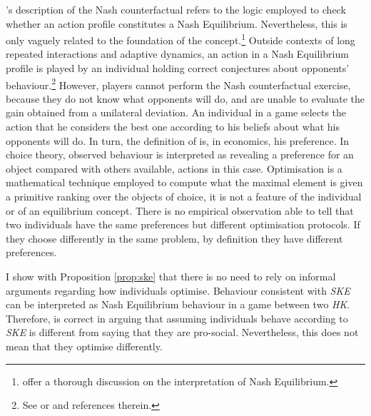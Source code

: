 \citeauthor{roemer2019we}'s description of the Nash counterfactual refers to the logic employed to check whether an action profile constitutes a Nash Equilibrium. Nevertheless, this is only vaguely related to the foundation of the concept.\footnote{\cite{battigalliGameTheoryAnalysis2023} offer a thorough discussion on the interpretation of Nash Equilibrium.} Outside contexts of long repeated interactions and adaptive dynamics, an action in a Nash Equilibrium profile is played by an individual holding correct conjectures about opponents' behaviour.\footnote{See \cite{pereaEpistemicGameTheory2012} or \cite{dekelEpistemicGameTheory2015} and references therein.} However, players cannot perform the Nash counterfactual exercise, because they do not know what opponents will do, and are unable to evaluate the gain obtained from a unilateral deviation. An individual in a game selects the action that he considers the best one according to his beliefs about what his opponents will do. In turn, the definition of  is, in economics, his preference. In choice theory, observed behaviour is interpreted as revealing a preference for an object compared with others available, actions in this case. Optimisation is a mathematical technique employed to compute what the maximal element is given a primitive ranking over the objects of choice, it is not a feature of the individual or of an equilibrium concept. There is no empirical observation able to tell that two individuals have the same preferences but different optimisation protocols. If they choose differently in the same problem, by definition they have different preferences.

I show with Proposition \ref{prop:ske} that there is no need to rely on informal arguments regarding how individuals optimise. Behaviour consistent with \textit{SKE} can be interpreted as Nash Equilibrium behaviour in a game between two \textit{HK}. Therefore, \citeauthor{roemer2019we} is correct in arguing that assuming individuals behave according to \textit{SKE} is different from saying that they are pro-social. Nevertheless, this does not mean that they optimise differently.

